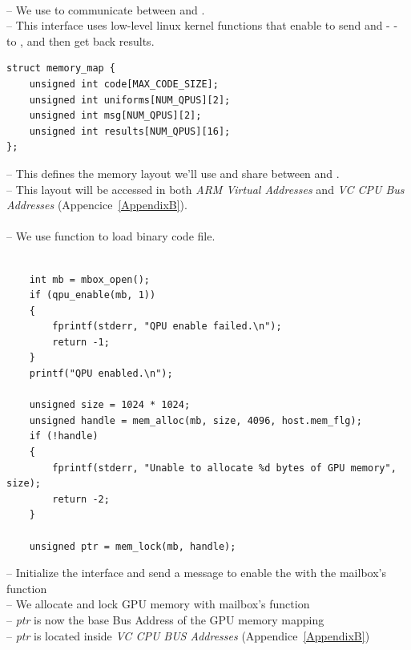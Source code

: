 \\
-- We use  to communicate between \vc{} and \cpu.\\
-- This interface uses low-level linux kernel functions that enable  to send  and  -  - to , and then get back results.\\



\begin{lstlisting}
struct memory_map {
    unsigned int code[MAX_CODE_SIZE];
    unsigned int uniforms[NUM_QPUS][2];
    unsigned int msg[NUM_QPUS][2];
    unsigned int results[NUM_QPUS][16];
};
\end{lstlisting}
-- This defines the memory layout we’ll use and share between  and .\\
-- This layout will be accessed in both \emph{ARM Virtual Addresses} and \emph{VC CPU Bus Addresses} (Appencice~\ref{AppendixB}).\\

\\
-- We use  function to load  binary code file.\\~\\

\begin{lstlisting}
    int mb = mbox_open();
    if (qpu_enable(mb, 1))
    {
        fprintf(stderr, "QPU enable failed.\n");
        return -1;
    }
    printf("QPU enabled.\n");

    unsigned size = 1024 * 1024;
    unsigned handle = mem_alloc(mb, size, 4096, host.mem_flg);
    if (!handle)
    {
        fprintf(stderr, "Unable to allocate %d bytes of GPU memory", size);
        return -2;
    }

    unsigned ptr = mem_lock(mb, handle);
\end{lstlisting}

-- Initialize the  interface and send a message to enable the \qpu{} with the  mailbox's function\\
-- We allocate and lock GPU memory with  mailbox's function\\
-- \emph{ptr} is now the base Bus Address of the GPU memory mapping\\
-- \emph{ptr} is located inside \emph{VC CPU BUS Addresses} (Appendice~\ref{AppendixB})\\


